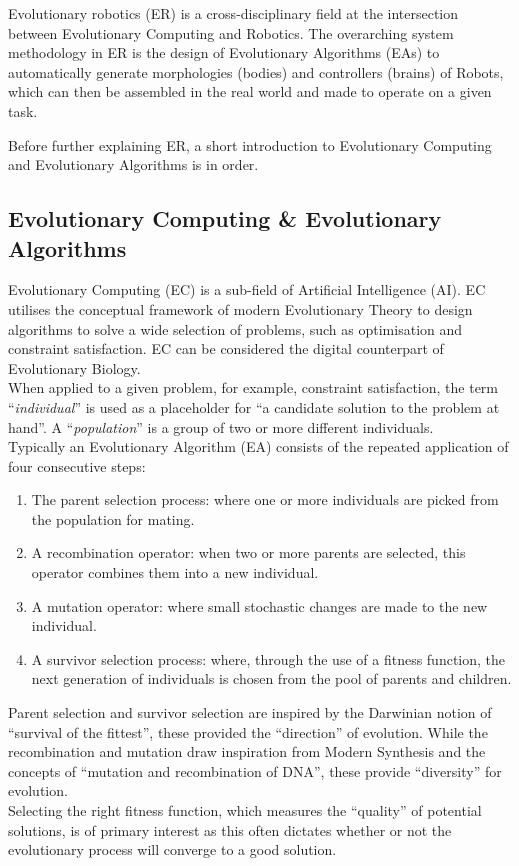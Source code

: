 \documentclass{scrartcl}
\begin{document}
Evolutionary robotics (ER) is a cross-disciplinary field at the intersection between Evolutionary Computing and Robotics. The overarching system methodology in ER is the design of Evolutionary Algorithms (EAs) to automatically generate morphologies (bodies) and controllers (brains) of Robots, which can then be assembled in the real world and made to operate on a given task.

Before further explaining ER, a short introduction to Evolutionary Computing and Evolutionary Algorithms is in order.

\subsection{Evolutionary Computing \& Evolutionary Algorithms}
Evolutionary Computing (EC) is a sub-field of Artificial Intelligence (AI).
EC utilises the conceptual framework of modern Evolutionary Theory to design algorithms to solve a wide selection of problems, such as optimisation and constraint satisfaction.
EC can be considered the digital counterpart of Evolutionary Biology. \\
When applied to a given problem, for example, constraint satisfaction, the term ``\textit{individual}'' is used as a placeholder for ``a candidate solution to the problem at hand''.
A ``\textit{population}'' is a group of two or more different individuals. \\

Typically an Evolutionary Algorithm (EA) consists of the repeated application of four consecutive steps:
\begin{enumerate}
  \item The parent selection process: where one or more individuals are picked from the population for mating.
  \item A recombination operator: when two or more parents are selected, this operator combines them into a new individual.
  \item A mutation operator: where small stochastic changes are made to the new individual.
  \item A survivor selection process: where, through the use of a fitness function, the next generation of individuals is chosen from the pool of parents and children.
\end{enumerate}

Parent selection and survivor selection are inspired by the Darwinian notion of ``survival of the fittest'', these provided the ``direction'' of evolution.
While the recombination and mutation draw inspiration from Modern Synthesis and the concepts of ``mutation and recombination of DNA'', these provide ``diversity'' for evolution.\\
Selecting the right fitness function, which measures the ``quality'' of potential solutions, is of primary interest as this often dictates whether or not the evolutionary process will converge to a good solution.\\
\end{document}
